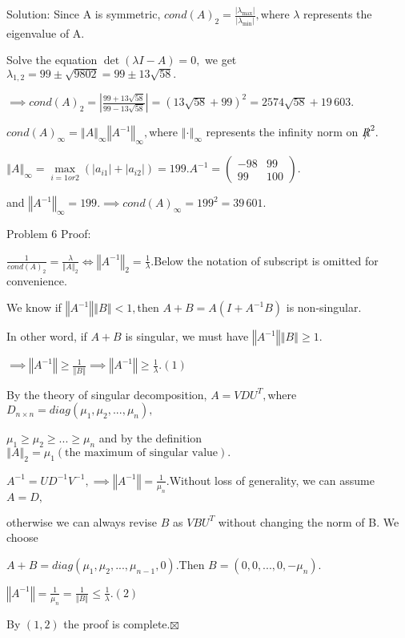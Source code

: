 \documentclass{article}
\begin{document}
Solution: Since A is symmetric, $cond(A)_{2}=\frac{\left\vert \lambda _{\max
}\right\vert }{\left\vert \lambda _{\min }\right\vert },$where $\lambda $
represents the eigenvalue of A.

Solve the equation $\det (\lambda I-A)=0,$ we get $\lambda _{1,2}=99\pm 
\sqrt{9802}=99\pm \allowbreak 13\sqrt{58}.$

$\implies cond(A)_{2}=\left\vert \frac{99+13\sqrt{58}}{99-13\sqrt{58}}%
\right\vert =\left( 13\sqrt{58}+99\right) ^{2}=\allowbreak 2574\sqrt{58}%
+19\,603.$

$cond(A)_{\infty }=\left\Vert A\right\Vert _{\infty }\left\Vert
A^{-1}\right\Vert _{\infty },$where $\left\Vert \cdot \right\Vert _{\infty }$
represents the infinity norm on $\NEG{R}^{2}.$

$\left\Vert A\right\Vert _{\infty }=\underset{i=1or2}{\max }\left(
\left\vert a_{i1}\right\vert +\left\vert a_{i2}\right\vert \right)
=199.A^{-1}=\left( 
\begin{array}{cc}
-98 & 99 \\ 
99 & 100%
\end{array}%
\right) .$

and $\left\Vert A^{-1}\right\Vert _{\infty }=199.\implies cond\left(
A\right) _{\infty }=199^{2}=\allowbreak 39\,601.$

Problem 6 \bigskip Proof:

$\frac{1}{cond\left( A\right) _{2}}=\frac{\lambda }{\left\Vert A\right\Vert
_{2}}\iff \left\Vert A^{-1}\right\Vert _{2}=\frac{1}{\lambda }.$Below the
notation of subscript is omitted for convenience.

We know if $\left\Vert A^{-1}\right\Vert \left\Vert B\right\Vert <1,$then $%
A+B=A(I+A^{-1}B)$ is non-singular.

In other word, if $A+B$ is singular, we must have $\left\Vert
A^{-1}\right\Vert \left\Vert B\right\Vert \geq 1.$

$\implies \left\Vert A^{-1}\right\Vert \geq \frac{1}{\left\Vert B\right\Vert 
}\implies \left\Vert A^{-1}\right\Vert \geq \frac{1}{\lambda }.\left(
1\right) $

\bigskip By the theory of singular decomposition, $A=VDU^{T},$where $%
D_{n\times n}=diag\left( \mu _{1},\mu _{2},...,\mu _{n}\right) ,$

$\mu _{1}\geq \mu _{2}\geq ...\geq \mu _{n}$ and by the definition $%
\left\Vert A\right\Vert _{2}=\mu _{1}\left( \text{the maximum of singular
value}\right) .$

$A^{-1}=UD^{-1}V^{-1},\implies \left\Vert A^{-1}\right\Vert =\frac{1}{\mu
_{n}}.$Without loss of generality, we can assume $A=D,$

otherwise we can always revise $B$ as $VBU^{T}$ without changing the norm of
B$.$ We choose

$A+B=diag\left( \mu _{1},\mu _{2},...,\mu _{n-1},0\right) .$Then $B=\left(
0,0,...,0,-\mu _{n}\right) .$

$\left\Vert A^{-1}\right\Vert =\frac{1}{\mu _{n}}=\frac{1}{\left\Vert
B\right\Vert }\leq \frac{1}{\lambda }.\left( 2\right) $

By $\left( 1,2\right) $ the proof is complete.$\boxtimes $
\end{document}
